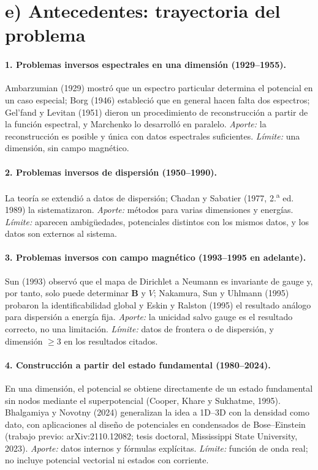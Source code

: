 \documentclass[12pt,letterpaper]{article}
\newcommand{\Bv}{\mathbf{B}}
\begin{document}
\section*{e) Antecedentes: trayectoria del problema}

\paragraph{1. Problemas inversos espectrales en una dimensión (1929--1955).} Ambarzumian (1929) mostró que un espectro
particular determina el potencial en un caso especial; Borg (1946) estableció que en general hacen falta dos espectros;
Gel'fand y Levitan (1951) dieron un procedimiento de reconstrucción a partir de la función espectral, y Marchenko lo
desarrolló en paralelo. \emph{Aporte:} la reconstrucción es posible y única con datos espectrales suficientes.
\emph{Límite:} una dimensión, sin campo magnético.

\paragraph{2. Problemas inversos de dispersión (1950--1990).} La teoría se extendió a datos de dispersión; Chadan y
Sabatier (1977, 2.\textsuperscript{a} ed. 1989) la sistematizaron. \emph{Aporte:} métodos para varias dimensiones y
energías. \emph{Límite:} aparecen ambigüedades, potenciales distintos con los mismos datos, y los datos son externos al
sistema.

\paragraph{3. Problemas inversos con campo magnético (1993--1995 en adelante).} Sun (1993) observó que el mapa de
Dirichlet a Neumann es invariante de gauge y, por tanto, solo puede determinar $\Bv$ y $V$; Nakamura, Sun y Uhlmann (1995)
probaron la identificabilidad global y Eskin y Ralston (1995) el resultado análogo para dispersión a energía fija.
\emph{Aporte:} la unicidad salvo gauge es el resultado correcto, no una limitación. \emph{Límite:} datos de frontera o
de dispersión, y dimensión $\ge3$ en los resultados citados.

\paragraph{4. Construcción a partir del estado fundamental (1980--2024).} En una dimensión, el potencial se obtiene
directamente de un estado fundamental sin nodos mediante el superpotencial (Cooper, Khare y Sukhatme, 1995). Bhalgamiya
y Novotny (2024) generalizan la idea a 1D--3D con la densidad como dato, con aplicaciones al diseño de potenciales en
condensados de Bose--Einstein (trabajo previo: arXiv:2110.12082; tesis doctoral, Mississippi State University, 2023).
\emph{Aporte:} datos internos y fórmulas explícitas. \emph{Límite:} función de onda real; no incluye potencial vectorial
ni estados con corriente.
\end{document}
